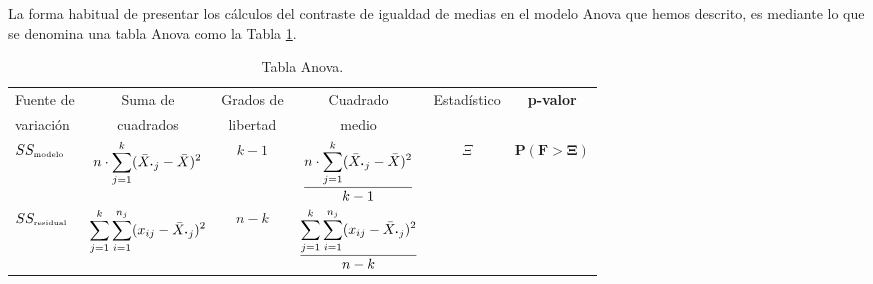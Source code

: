 La forma habitual de presentar los cálculos del contraste de igualdad de medias en el modelo Anova que hemos descrito, es mediante lo que se denomina una {\sf tabla Anova} como la Tabla \ref{cap11:tabla:Anova02}.

\setlength{\tabcolsep}{5pt}
\begin{center}
\begin{table}[ht]
    \begin{tabular}{@{}l@{\quad} c c c @{}c@{} c}
    \hline
    {\small Fuente de}&{\small Suma de}&{\small Grados de}&{\small Cuadrado}&{\small Estadístico}&{\small
    {\bf p-valor}}\\
    {\small variación}&{\small cuadrados}&{\small libertad}&{\small medio}& &\\
    \hline
    $SS_{\mbox{\tiny modelo}}$&{\small $n\cdot\displaystyle\sum_{j=1}^k (\bar X_{\mbox{\bf\large $\cdot$}j}-\bar X)^2$}&$k-1$&{\small $\dfrac{n\cdot \displaystyle\sum_{j=1}^k (\bar X_{\mbox{\bf\large $\cdot$}j}-\bar X)^2}{k-1}$}&$\Xi$&{$\mathbf{P(F>\Xi)}$ }\\[3mm]

    $SS_{\mbox{\tiny residual}}$&{\small $\displaystyle\sum_{j=1}^k\sum_{i=1}^{n_j}(x_{ij}-\bar X_{\mbox{\bf\large $\cdot$}j})^2$}&$n-k$&{\small $\dfrac{\displaystyle\sum_{j=1}^k\sum_{i=1}^{n_j}(x_{ij}-\bar X_{\mbox{\bf\large $\cdot$}j})^2}{n-k}$}\\
    \hline
    \end{tabular}
\caption{Tabla Anova.}
\label{cap11:tabla:Anova02}
\end{table}
\end{center}
\setlength{\tabcolsep}{6pt}

